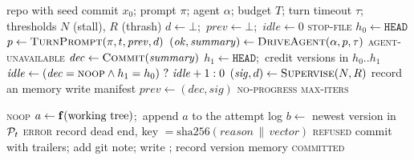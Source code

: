 \begin{algorithm}[t]
\caption{: the outer loop}
\label{alg:run}
\begin{algorithmic}[1]
\Require repo with seed commit $x_0$; prompt $\pi$; agent $\alpha$; budget $T$; turn timeout $\tau$;
  thresholds $N$ (stall), $R$ (thrash)
\State {} 
\State $d \gets \bot$;\ $\mathit{prev} \gets \bot$;\ $\mathit{idle} \gets 0$
   \Return \textsc{stop-file} \EndIf
  \State $h_0 \gets \texttt{HEAD}$
  \State $p \gets \Call{TurnPrompt}{\pi, t, \mathit{prev}, d}$ 
  \State $(\mathit{ok}, \mathit{summary}) \gets \Call{DriveAgent}{\alpha, p, \tau}$
   \Return \textsc{agent-unavailable} \EndIf
  \State $\mathit{dec} \gets \Call{Commit}{\mathit{summary}}$ 
  \State $h_1 \gets \texttt{HEAD}$;\ credit versions in $h_0..h_1$ 
  \State $\mathit{idle} \gets (\mathit{dec} = \textsc{noop} \wedge h_1 = h_0)\ ?\ \mathit{idle}+1 : 0$
  \State $(\mathit{sig}, d) \gets \Call{Supervise}{N, R}$ 
   record an  memory \EndIf
  \State write manifest 
  \State $\mathit{prev} \gets (\mathit{dec}, \mathit{sig})$
   \Return \textsc{no-progress} \EndIf
\EndFor
\State \Return \textsc{max-iters}
\end{algorithmic}
\end{algorithm}

\begin{algorithm}[t]
\caption{\textsc{Commit}($\mathit{why}$): the only writer of $\Pt$}
\label{alg:commit}
\begin{algorithmic}[1]
 \Return \textsc{noop} \EndIf
\State $a \gets \mathbf{f}(\text{working tree})$;\ append $a$ to the attempt log
\State $b \gets$ newest version in $\Pt$ 
 \Return \textsc{error} \EndIf
{} 
  \State record dead end, key $= \mathrm{sha256}(\mathit{reason}\,\|\,\mathit{vector})$
  \State \Return \textsc{refused}
\EndIf
\State commit with trailers; add git note; write ; record version memory
\State \Return \textsc{committed}
\end{algorithmic}
\end{algorithm}

